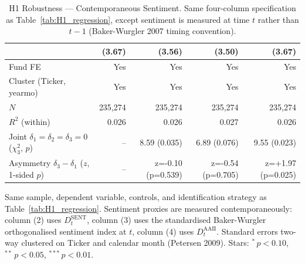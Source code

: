 \begin{table}[H]
{\begin{tabular}[t]{lrrrr}
 & (3.67) & (3.56) & (3.50) & (3.67)\\
\midrule
Fund FE & Yes & Yes & Yes & Yes\\
Cluster (Ticker, yearmo) & Yes & Yes & Yes & Yes\\
$N$ & 235,274 & 235,274 & 235,274 & 235,274\\
$R^2$ (within) & 0.026 & 0.026 & 0.027 & 0.026\\
Joint $\delta_1=\delta_2=\delta_3=0$ ($\chi^2_3$, $p$) & -- & 8.59 (0.035) & 6.89 (0.076) & 9.55 (0.023)\\
Asymmetry $\delta_3-\delta_1$ ($z$, 1-sided $p$) & -- & z=-0.10 (p=0.539) & z=-0.54 (p=0.705) & z=+1.97 (p=0.025)\\
\bottomrule
\end{tabular}%
}
\setlength{\tabletempwidth}{\wd\tabletempbox}
\ifdim\tabletempwidth>\linewidth\setlength{\tabletempwidth}{\linewidth}\fi
\begin{minipage}{\tabletempwidth}
\captionsetup{width=\linewidth}
\caption{\label{tab:H1_contemporaneous}H1 Robustness --- Contemporaneous Sentiment. Same four-column specification as Table~\ref{tab:H1_regression}, except sentiment is measured at time $t$ rather than $t-1$ (Baker-Wurgler 2007 timing convention).}
\ifdim\wd\tabletempbox>\linewidth
  \resizebox{\linewidth}{!}{\usebox{\tabletempbox}}
\else
  \usebox{\tabletempbox}
\fi
\par\medskip
\begin{singlespace}\footnotesize\noindent
Same sample, dependent variable, controls, and identification strategy as Table~\ref{tab:H1_regression}. Sentiment proxies are measured contemporaneously: column (2) uses $D^{\text{SENT}}_t$, column (3) uses the standardised Baker-Wurgler orthogonalised sentiment index at $t$, column (4) uses $D^{\text{AAII}}_t$. Standard errors two-way clustered on Ticker and calendar month (Petersen 2009). Stars: $^{*}\,p<0.10$, $^{**}\,p<0.05$, $^{***}\,p<0.01$.
\end{singlespace}
\end{minipage}
\end{table}
